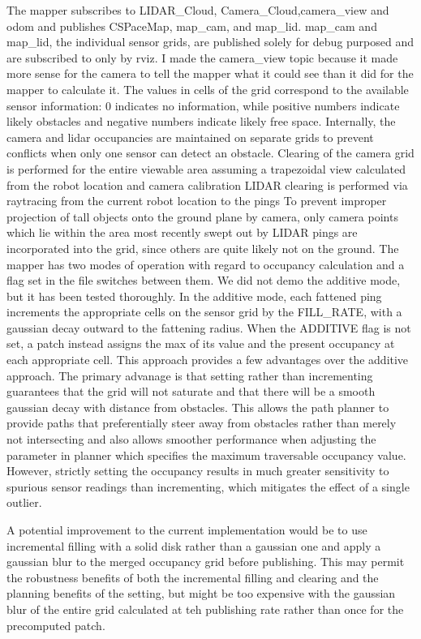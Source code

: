\documentclass{article}
\begin{document}
The mapper subscribes to LIDAR_Cloud, Camera_Cloud,camera_view and odom and publishes CSPaceMap, map_cam, and map_lid.  map_cam and map_lid, the individual sensor grids, are published solely for debug purposed and are subscribed to only by rviz.
I made the camera_view topic because it made more sense for the camera to tell the mapper what it could see than it did for the mapper to calculate it.
The values in cells of the grid correspond to the available sensor information: 0 indicates no information, while positive numbers indicate likely obstacles and negative numbers indicate likely free space.
Internally, the camera and lidar occupancies are maintained on separate grids to prevent conflicts when only one sensor can detect an obstacle.
Clearing of the camera grid is performed for the entire viewable area assuming a trapezoidal view calculated from the robot location and camera calibration
LIDAR clearing is performed via raytracing from the current robot location to the pings
To prevent improper projection of tall objects onto the ground plane by camera, only camera points which lie within the area most recently swept out by LIDAR pings are incorporated into the grid, since others are quite likely not on the ground.
The mapper has two modes of operation with regard to occupancy calculation and a flag set in the file switches between them.  We did not demo the additive mode, but it has been tested thoroughly.  In the additive mode, each fattened ping increments the appropriate cells on the sensor grid by the FILL_RATE, with a gaussian decay outward to the fattening radius.  When the ADDITIVE flag is not set, a patch instead assigns the max of its value and the present occupancy at each appropriate cell.  This approach provides a few advantages over the additive approach.  The primary advanage is that setting rather than incrementing guarantees that the grid will not saturate and that there will be a smooth gaussian decay with distance from obstacles.  This allows the path planner to provide paths that preferentially steer away from obstacles rather than merely not intersecting and also allows smoother performance when adjusting the parameter in planner which specifies the maximum traversable occupancy value.  However, strictly setting the occupancy results in much greater sensitivity to spurious sensor readings than incrementing, which mitigates the effect of a single outlier.

A potential improvement to the current implementation would be to use incremental filling with a solid disk rather than a gaussian one and apply a gaussian blur to the merged occupancy grid before publishing.  This may permit the robustness benefits of both the incremental filling and clearing and the planning benefits of the setting, but might be too expensive with the gaussian blur of the entire grid calculated at teh publishing rate rather than once for the precomputed patch.
\end{document}
